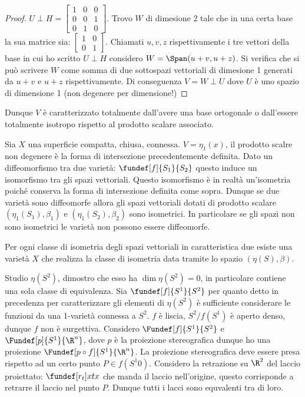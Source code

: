 \begin{proof}
 $U \perp H = \left[\begin{smallmatrix} 1 & 0 & 0 \\ 0 & 0 & 1 \\ 0 & 1 & 0 \end{smallmatrix}\right]$. Trovo $W$ di dimesione 2 tale che in una certa base la sua matrice sia:
 $ \left[\begin{smallmatrix} 1 & 0 \\ 0 & 1 \end{smallmatrix}\right]$. Chiamati $u, v, z$ rispettivamente i tre vettori della base in cui ho scritto $U \perp H$ considero $W = \Span(u+v, u+z)$.
 Si verifica che si può scrivere $W$ come somma di due sottospazi vettoriali di dimesione 1 generati da $u+v$ e $u+z$ rispettivamente. Di conseguenza $V = W \perp U$ dove $U$ è uno spazio di dimensione 1  (non degenere per dimensione!)
\end{proof}

Dunque $V$ è caratterizzato totalmente dall'avere una base ortogonale o dall'essere totalmente isotropo rispetto al prodotto scalare associato.

Sia $X$ una superficie compatta, chiusa, connessa. $V = \eta _1(x)$, il prodotto scalre non degenere è la forma di intersezione precedentemente definita. Dato un diffeomorfismo tra due varietà:
$\fundef[f]{S_1}{S_2}$ questo induce un isomorfismo tra gli spazi vettoriali. Questo isomorfismo è in realtà un'isometria poiché conserva la forma di intersezione definita come sopra.
Dunque se due varietà sono diffeomorfe allora gli spazi vettoriali dotati di prodotto scalare $(\eta _1(S_1), \beta_1)$ e $(\eta _1(S_2), \beta_2)$ sono isometrici. In particolare se gli spazi non sono isometrici le varietà non possono essere diffeomorfe.

Per ogni classe di isometria degli spazi vettoriali in caratteristica due esiste  una varietà $X$ che realizza la classe di isometria data tramite lo spazio $(\eta(S), \beta)$.


Studio $\eta(S^{2})$, dimostro che esso ha $\dim \eta(S^{2}) = 0$, in particolare contiene una sola classe di equivalenza. Sia $\fundef[f]{S^1}{S^2}$ per quanto detto in precedenza per caratterizzare
gli elementi di $\eta(S^{2})$ è sufficiente considerare le funzioni da una 1-varietà connessa a $S^2$. $f$ è liscia, $S^{2}/f(S^1)$ è aperto denso, dunque $f$ non è surgettiva. Considero 
$\Fundef[f]{S^{1}}{S^{2}}$ e $\Fundef[p]{S^{1}}{\R^n}$, dove $p$ è la proiezione stereografica dunque ho una proiezione $\Fundef[p \circ f]{S^{1}}{\R^n}$. 
La proiezione stereografica deve essere presa rispetto ad un certo punto $P \in f(S^1 0)$. Considero la retrazione su $\R^2$ del laccio proiettato: $\fundef[r_{t}]{x}{tx}$ che manda il laccio nell'origine, questo corrisponde a retrarre
il laccio nel punto $P$. Dunque tutti i lacci sono equvalenti tra di loro.

